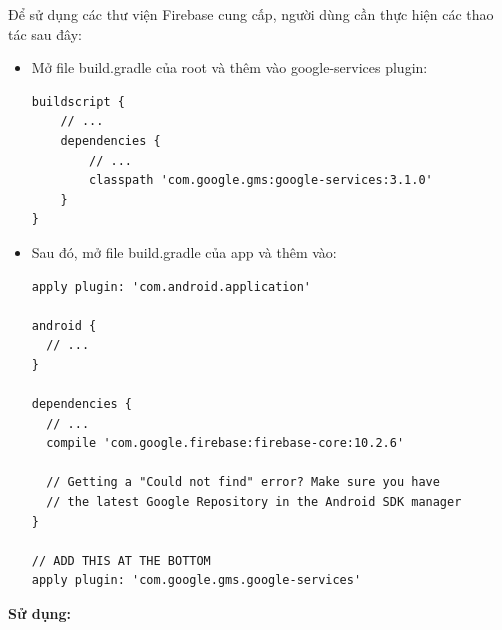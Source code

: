 Để sử dụng các thư viện Firebase cung cấp, người dùng cần thực hiện các thao tác sau đây:
\begin{itemize}
	\item Mở file \textcolor{pgrey}{build.gradle} của root và thêm vào google-services plugin:
	\begin{lstlisting}[frame=single, style=javacode, breaklines=true]
buildscript {
    // ...
    dependencies {
        // ...
        classpath 'com.google.gms:google-services:3.1.0'
    }
}	

	\end{lstlisting}
	\item Sau đó, mở file \textcolor{pgrey}{build.gradle} của app và thêm vào:
	\begin{lstlisting}[frame=single, style=javacode, breaklines=true]
apply plugin: 'com.android.application'

android {
  // ...
}

dependencies {
  // ...
  compile 'com.google.firebase:firebase-core:10.2.6'
  
  // Getting a "Could not find" error? Make sure you have
  // the latest Google Repository in the Android SDK manager
}

// ADD THIS AT THE BOTTOM
apply plugin: 'com.google.gms.google-services' 

	\end{lstlisting}

\end{itemize}

\textbf{Sử dụng:}

